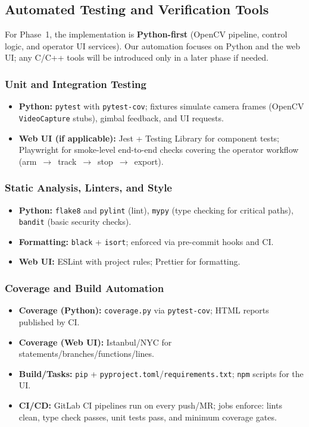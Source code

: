\documentclass[12pt, titlepage]{article}
\begin{document}
\subsection{Automated Testing and Verification Tools}

For Phase~1, the implementation is \textbf{Python-first} (OpenCV 
pipeline, control logic, and operator UI services). Our automation 
focuses on Python and the web UI; any C/C++ tools will be introduced only 
in a later phase if needed.

\subsubsection*{Unit and Integration Testing}
\begin{itemize}
  \item \textbf{Python:} \texttt{pytest} with \texttt{pytest-cov}; fixtures 
  simulate camera frames (OpenCV \texttt{VideoCapture} stubs), gimbal feedback, 
  and UI requests.
  \item \textbf{Web UI (if applicable):} Jest + Testing Library for component
   tests; Playwright for smoke-level end-to-end checks covering the operator 
   workflow (arm~$\rightarrow$~track~$\rightarrow$~stop~$\rightarrow$~export).
\end{itemize}

\subsubsection*{Static Analysis, Linters, and Style}
\begin{itemize}
  \item \textbf{Python:} \texttt{flake8} and \texttt{pylint} (lint), 
  \texttt{mypy} (type checking for critical paths), \texttt{bandit} (basic security checks).
  \item \textbf{Formatting:} \texttt{black} + \texttt{isort}; enforced 
  via pre-commit hooks and CI.
  \item \textbf{Web UI:} ESLint with project rules; Prettier for formatting.
\end{itemize}

\subsubsection*{Coverage and Build Automation}
\begin{itemize}
  \item \textbf{Coverage (Python):} \texttt{coverage.py} via \texttt{pytest-cov}; 
  HTML reports published by CI.
  \item \textbf{Coverage (Web UI):} Istanbul/NYC for statements/branches/functions/lines.
  \item \textbf{Build/Tasks:} \texttt{pip} + \texttt{pyproject.toml}/\texttt{requirements.txt};
   \texttt{npm} scripts for the UI.
  \item \textbf{CI/CD:} GitLab CI pipelines run on every push/MR; jobs enforce: lints clean, 
  type check passes, unit tests pass, and minimum coverage gates.
\end{itemize}
\end{document}
